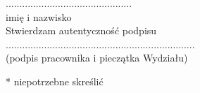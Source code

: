 \documentclass[12pt,a4paper,twoside,openright]{report}
\begin{document}
\centering
\hspace{200pt} ..............................................\\[0mm]
\hspace{200pt} imię i nazwisko\\[10mm]
\hspace{200pt} Stwierdzam autentyczność podpisu\\[5mm]
\hspace{200pt} .....................................................................\\[0mm]
\hspace{200pt} (podpis  pracownika i pieczątka Wydziału)\\[20mm]
 
 \raggedright
 * niepotrzebne skreślić
\end{document}
